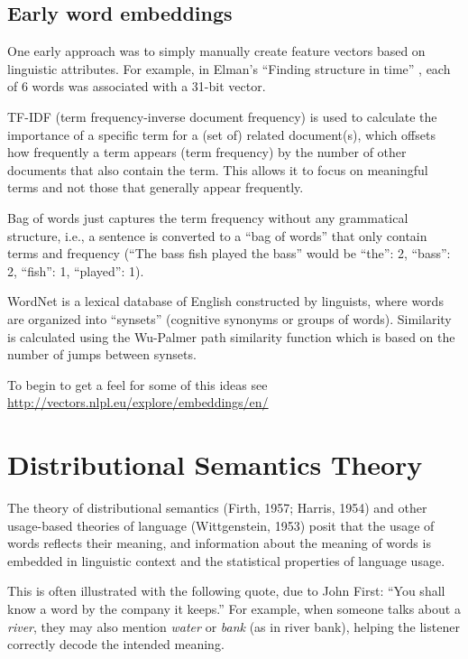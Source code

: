 \subsection{Early word embeddings}

One early approach was to simply manually create feature vectors based on linguistic attributes.  For example, in Elman's ``Finding structure in time'' \cite{elman1990finding}, each of 6 words was associated with a 31-bit vector. 

TF-IDF (term frequency-inverse document frequency) is used to calculate the importance of a specific term for a (set of) related document(s), which offsets how frequently a term appears (term frequency) by the number of other documents that also contain the term. This allows it to focus on meaningful terms and not those that generally appear frequently. 

Bag of words just captures the term frequency without any grammatical structure, i.e., a sentence is converted to a ``bag of words'' that only contain terms and frequency (``The bass fish played the bass'' would be {``the'': 2, ``bass'': 2, ``fish'': 1, ``played'': 1}).

WordNet is a lexical database of English constructed by linguists, where words are organized into ``synsets'' (cognitive synonyms or groups of words). Similarity is calculated using the Wu-Palmer path similarity function which is based on the number of jumps between synsets.

To begin to get a feel for some of this ideas see \url{http://vectors.nlpl.eu/explore/embeddings/en/}
 
\section{Distributional Semantics Theory}


The theory of distributional semantics (Firth, 1957; Harris, 1954) and other usage-based theories of language (Wittgenstein, 1953) posit that the usage of words reflects their meaning, and information about the meaning of words is embedded in linguistic context and the statistical properties of language usage.

This is often illustrated with the following quote, due to John First: ``You shall know a word by the company it keeps.'' For example, when someone talks about a \textit{river}, they may also mention \textit{water} or \textit{bank} (as in river bank), helping the listener correctly decode the intended meaning.

